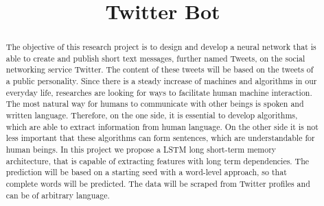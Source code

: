\documentclass[conference]{IEEEtran}
\begin{document}
\title{Twitter Bot}

\author{
\and
{}
\and
{}
}

\maketitle

\begin{abstract}
The objective of this research project is to design and develop a neural network that is able to create and publish short text messages, further named Tweets, on the social networking service Twitter. The content of these tweets will be based on the tweets of a public personality. Since there is a steady increase of machines and algorithms in our everyday life, researches are looking for ways to facilitate human machine interaction. The most natural way for humans to communicate with other beings is spoken and written language. Therefore, on the one side, it is essential to develop algorithms, which are able to extract information from human language. On the other side it is not less important that these algorithms can form sentences, which are understandable for human beings. In this project we propose a LSTM long short-term memory architecture, that is capable of extracting features with long term dependencies. The prediction will be based on a  starting seed with a word-level approach, so that complete words will be predicted. The data will be scraped from Twitter profiles and can be of arbitrary language. 
\end{abstract}
\end{document}
